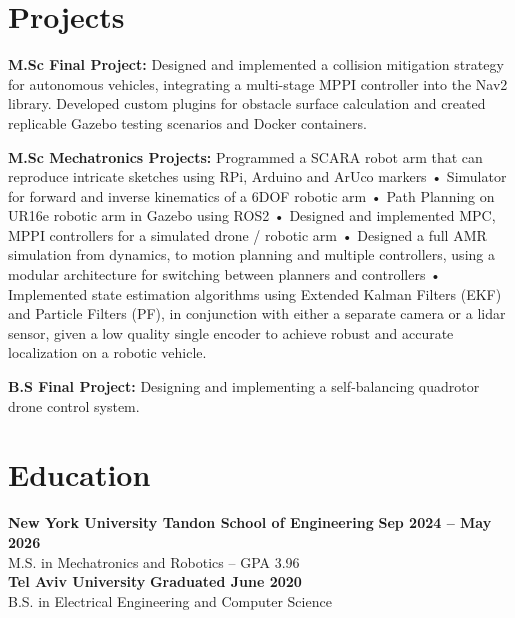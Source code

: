 \documentclass[10pt,letterpaper]{article}
\begin{document}
\section{Projects}
\textbf{M.Sc Final Project:} Designed and implemented a collision mitigation strategy for autonomous vehicles, integrating a multi-stage MPPI controller into the Nav2 library. Developed custom plugins for obstacle surface calculation and created replicable Gazebo testing scenarios and Docker containers.

\textbf{M.Sc Mechatronics Projects:} Programmed a SCARA robot arm that can reproduce intricate sketches using RPi, Arduino and ArUco markers • Simulator for forward and inverse kinematics of a 6DOF robotic arm • Path Planning on UR16e robotic arm in Gazebo using ROS2 • Designed and implemented MPC, MPPI controllers for a simulated drone / robotic arm • Designed a full AMR simulation from dynamics, to motion planning and multiple controllers, using a modular architecture for switching between planners and controllers • Implemented state estimation algorithms using Extended Kalman Filters (EKF) and Particle Filters (PF), in conjunction with either a separate camera or a lidar sensor, given a low quality single encoder to achieve robust and accurate localization on a robotic vehicle.

\textbf{B.S Final Project:} Designing and implementing a self-balancing quadrotor drone control system.

\section{Education}
\textbf{New York University Tandon School of Engineering} \hfill \textbf{Sep 2024 -- May 2026} \\
M.S. in Mechatronics and Robotics -- GPA 3.96 \\[3pt]
\textbf{Tel Aviv University} \hfill \textbf{Graduated June 2020} \\
B.S. in Electrical Engineering and Computer Science
\end{document}
